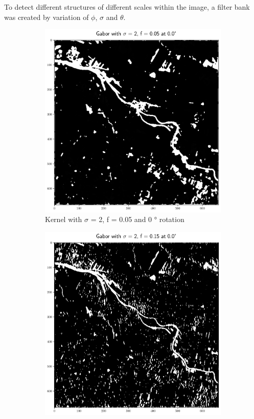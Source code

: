 \documentclass[a4paper, english]{article}
\begin{document}
    To detect different structures of different scales within the image, a filter bank was created by variation of $\phi$, $\sigma$ and $\theta$.



    \begin{figure}[!htbp]
       \centering
     \begin{subfigure}[b]{0.3\textwidth}
         \centering
         \includegraphics[width=\textwidth]{img/Features_2_005_0.png}
         \caption{Kernel with $\sigma$ = 2, f = 0.05 and 0 ° rotation}\label{fig:feat01}
     \end{subfigure}
     \hfill
     \begin{subfigure}[b]{0.3\textwidth}
         \centering
         \includegraphics[width=\textwidth]{img/Features_2_015_0.png}

\end{subfigure}
\end{figure}
\end{document}

